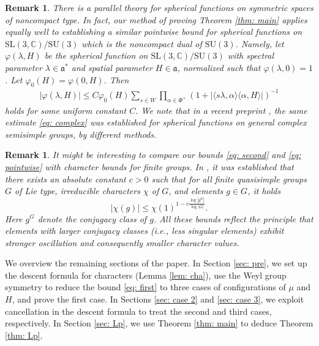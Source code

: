 \documentclass{amsart}
\numberwithin{equation}{section}
\newtheorem{rem}[thm]{Remark}
\numberwithin{equation}{section}
\begin{document}
\begin{rem}
There is a parallel theory for spherical functions on symmetric spaces of noncompact type. In fact, our method of proving Theorem \ref{thm: main} applies equally well to establishing a similar pointwise bound for spherical functions on $\mathrm{SL}(3,\mathbb{C})/\mathrm{SU}(3)$ which is the noncompact dual of $\mathrm{SU}(3)$. Namely, let $\varphi(\lambda,H)$ be the spherical function on $\mathrm{SL}(3,\mathbb{C})/\mathrm{SU}(3)$ with spectral parameter $\lambda\in \mathfrak{a}^*$ and spatial parameter $H\in \mathfrak{a}$, normalized such that $\varphi(\lambda,0)=1$. 
Let 
$\varphi_0(H)=\varphi(0,H)$. 
Then 
\begin{align}\label{eq: complex}
    |\varphi(\lambda, H)|\leq C\varphi_0(H)\sum_{s\in W}\prod_{\alpha\in\Phi^+}\left( 1+
    |\langle s\lambda, \alpha\rangle \langle \alpha,H\rangle|\right)^{-1}
\end{align}
holds for some uniform constant $C$. We note that in a recent preprint \cite{BMMP26}, the same estimate \eqref{eq: complex} was established for spherical functions on general complex semisimple groups, by different methods. 

\end{rem}

\begin{rem}
It might be interesting to compare our bounds \eqref{eq: second} and \eqref{eq: pointwise} with character bounds for finite groups. In \cite{LT24}, it was established that there exists an absolute constant $c>0$ such that for all finite quasisimple groups $G$ of Lie type, irreducible characters $\chi$ of $G$, and elements $g\in G$, it holds 
$$|\chi(g)|\leq \chi(1)^{1-c\frac{\log |g^G|}{\log |G|}}.$$
Here $g^G$ denote the conjugacy class of $g$. All these bounds reflect the principle that elements with larger conjugacy classes (i.e., less singular elements) exhibit stronger oscillation and consequently smaller character values. 
\end{rem}

We overview the remaining sections of the paper. 
In Section \ref{sec: pre}, we set up the descent formula for characters (Lemma \ref{lem: cha}), use the Weyl group symmetry to reduce the bound \eqref{eq: first} to three cases of configurations of $\mu$ and $H$, and prove the first case. In Sections \ref{sec: case 2} and \ref{sec: case 3}, we exploit cancellation in the descent formula to treat the second and third cases, respectively. In Section \ref{sec: Lp}, we use Theorem \ref{thm: main} to deduce Theorem \ref{thm: Lp}. 
\end{document}
